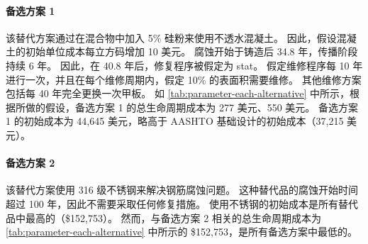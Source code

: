 \paragraph*{备选方案 1}
该替代方案通过在混合物中加入 5\% 硅粉来使用不透水混凝土。 因此，假设混凝土的初始单位成本每立方码增加 10 美元。 腐蚀开始于铸造后 34.8 年，传播阶段持续 6 年。 因此，在 40.8 年后，修复程序被假定为 stat。 假定维修程序每 10 年进行一次，并且在每个维修周期内，假定 10\% 的表面积需要维修。 其他维修方案包括每 40 年完全更换一次甲板。 如 \cref{tab:parameter-each-alternative} 中所示，根据所做的假设，备选方案 1 的总生命周期成本为 277 美元、550 美元。 备选方案 1 的初始成本为 44,645 美元，略高于 AASHTO 基础设计的初始成本（37,215 美元）。

\paragraph*{备选方案 2}
该替代方案使用 316 级不锈钢来解决钢筋腐蚀问题。 这种替代品的腐蚀开始时间超过 100 年，因此不需要采取任何修复措施。 使用不锈钢的初始成本是所有替代品中最高的（\$152,753）。 然而，与备选方案 2 相关的总生命周期成本为 \cref{tab:parameter-each-alternative} 中所示的 \$152,753，是所有备选方案中最低的。

